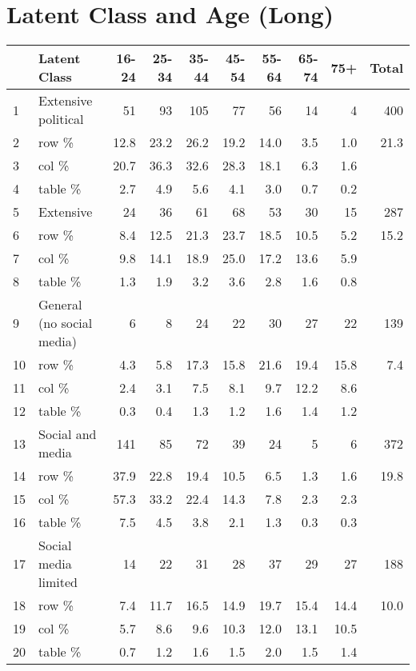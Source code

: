 \documentclass{article}
\begin{document}
\section{Latent Class and Age (Long)}

\begin{table}[ht]
\centering
\begin{tabular}{llrrrrrrrr}
  \hline
 & Latent Class & 16-24 & 25-34 & 35-44 & 45-54 & 55-64 & 65-74 & 75+ & Total \\ 
  \hline
1 & Extensive political & 51 & 93 & 105 & 77 & 56 & 14 & 4 & 400 \\ 
  2 & row \% & 12.8 & 23.2 & 26.2 & 19.2 & 14.0 & 3.5 & 1.0 & 21.3 \\ 
  3 & col \% & 20.7 & 36.3 & 32.6 & 28.3 & 18.1 & 6.3 & 1.6 &  \\ 
  4 & table \% & 2.7 & 4.9 & 5.6 & 4.1 & 3.0 & 0.7 & 0.2 &  \\ 
  5 & Extensive & 24 & 36 & 61 & 68 & 53 & 30 & 15 & 287 \\ 
  6 & row \% & 8.4 & 12.5 & 21.3 & 23.7 & 18.5 & 10.5 & 5.2 & 15.2 \\ 
  7 & col \% & 9.8 & 14.1 & 18.9 & 25.0 & 17.2 & 13.6 & 5.9 &  \\ 
  8 & table \% & 1.3 & 1.9 & 3.2 & 3.6 & 2.8 & 1.6 & 0.8 &  \\ 
  9 & General (no social media) & 6 & 8 & 24 & 22 & 30 & 27 & 22 & 139 \\ 
  10 & row \% & 4.3 & 5.8 & 17.3 & 15.8 & 21.6 & 19.4 & 15.8 & 7.4 \\ 
  11 & col \% & 2.4 & 3.1 & 7.5 & 8.1 & 9.7 & 12.2 & 8.6 &  \\ 
  12 & table \% & 0.3 & 0.4 & 1.3 & 1.2 & 1.6 & 1.4 & 1.2 &  \\ 
  13 & Social and media & 141 & 85 & 72 & 39 & 24 & 5 & 6 & 372 \\ 
  14 & row \% & 37.9 & 22.8 & 19.4 & 10.5 & 6.5 & 1.3 & 1.6 & 19.8 \\ 
  15 & col \% & 57.3 & 33.2 & 22.4 & 14.3 & 7.8 & 2.3 & 2.3 &  \\ 
  16 & table \% & 7.5 & 4.5 & 3.8 & 2.1 & 1.3 & 0.3 & 0.3 &  \\ 
  17 & Social media limited & 14 & 22 & 31 & 28 & 37 & 29 & 27 & 188 \\ 
  18 & row \% & 7.4 & 11.7 & 16.5 & 14.9 & 19.7 & 15.4 & 14.4 & 10.0 \\ 
  19 & col \% & 5.7 & 8.6 & 9.6 & 10.3 & 12.0 & 13.1 & 10.5 &  \\ 
  20 & table \% & 0.7 & 1.2 & 1.6 & 1.5 & 2.0 & 1.5 & 1.4 &  \\ 

\end{tabular}
\end{table}
\end{document}
